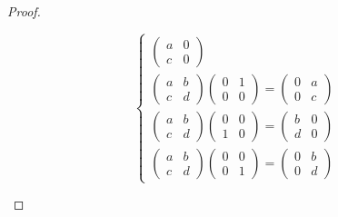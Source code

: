 \documentclass[class=linearalgebra,crop=false]{standalone}
\begin{document}
\begin{proof}
\begin{enumerate}[label = (\alph*)]
\[\begin{cases}
\begin{pmatrix}
                        a & 0 \\
                        c & 0
                    \end{pmatrix} \\
                    \begin{pmatrix}
                        a & b \\
                        c & d
                    \end{pmatrix}
                    \begin{pmatrix}
                        0 & 1 \\
                        0 & 0
                    \end{pmatrix}=
                    \begin{pmatrix}
                        0 & a \\
                        0 & c
                    \end{pmatrix} \\
                    \begin{pmatrix}
                        a & b \\
                        c & d
                    \end{pmatrix}
                    \begin{pmatrix}
                        0 & 0 \\
                        1 & 0
                    \end{pmatrix}=
                    \begin{pmatrix}
                        b & 0 \\
                        d & 0
                    \end{pmatrix} \\
                    \begin{pmatrix}
                        a & b \\
                        c & d
                    \end{pmatrix}
                    \begin{pmatrix}
                        0 & 0 \\
                        0 & 1
                    \end{pmatrix}=
                    \begin{pmatrix}
                        0 & b \\
                        0 & d
                    \end{pmatrix}
                \end{cases}
\]
\end{enumerate}
\end{proof}
\end{document}
